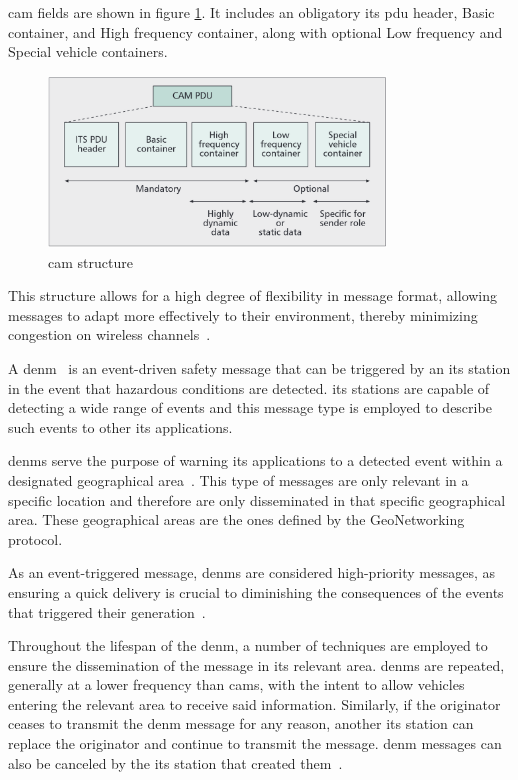 \gls{cam} fields are shown in figure \ref{fig:cam_structure}. It includes an obligatory \gls{its} \gls{pdu} header, Basic container, and High frequency container, along with optional Low frequency and Special vehicle containers.

\begin{figure}[htbp]
    \centering
    \includegraphics[width=0.8\textwidth]{Chapters/Figures/VANETs/cam_structure.png}
   	\caption{\gls{cam} structure~\cite{festag_cooperative_2014}}
   	\label{fig:cam_structure}
\end{figure}

This structure allows for a high degree of flexibility in message format, allowing messages to adapt more effectively to their environment, thereby minimizing congestion on wireless channels~\cite{festag_cooperative_2014}.

A \gls{denm}~\cite{etsi_intelligent_2019-1} is an event-driven safety message that can be triggered by an \gls{its} station in the event that hazardous conditions are detected. \gls{its} stations are capable of detecting a wide range of events and this message type is employed to describe such events to other \gls{its} applications. 

\glspl{denm} serve the purpose of warning \gls{its} applications to a detected event within a designated geographical area~\cite{festag_cooperative_2014}. This type of messages are only relevant in a specific location and therefore are only disseminated in that specific geographical area. These geographical areas are the ones defined by the GeoNetworking protocol.

As an event-triggered message, \glspl{denm} are considered high-priority messages, as ensuring a quick delivery is crucial to diminishing the consequences of the events that triggered their generation~\cite{al-sultan_comprehensive_2014}.

Throughout the lifespan of the \gls{denm}, a number of techniques are employed to ensure the dissemination of the message in its relevant area. \glspl{denm} are repeated, generally at a lower frequency than \glspl{cam}, with the intent to allow vehicles entering the relevant area to receive said information. Similarly, if the originator ceases to transmit the \gls{denm} message for any reason, another \gls{its} station can replace the originator and continue to transmit the message. \gls{denm} messages can also be canceled by the \gls{its} station that created them~\cite{festag_cooperative_2014}.

